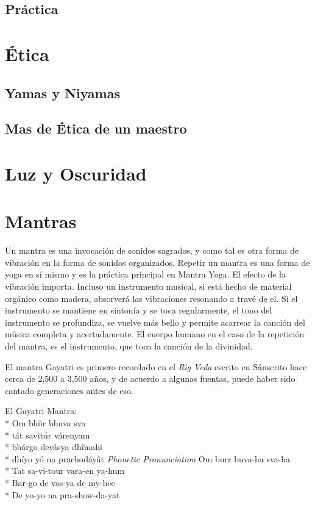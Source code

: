 \subsection{Práctica}
\section{Ética}
\subsection{Yamas y Niyamas}
\subsection{Mas de Ética de un maestro}
\section{Luz y Oscuridad}
\section{Mantras}
Un mantra es una invocación de sonidos sagrados, y como tal es otra forma de vibración en la forma de sonidos organizados. Repetir un mantra es una forma de yoga en sí mismo y es la práctica principal en Mantra Yoga. El efecto de la vibración importa. Incluso un instrumento musical, si está hecho de material orgánico como madera, absorverá las vibraciones resonando a travé de el. Si el instrumento se mantiene en sintonía y se toca regularmente, el tono del instrumento se profundiza, se vuelve más bello y permite acarrear la canción del música completa y acertadamente. El cuerpo humano en el caso de la repetición del mantra, es el instrumento, que toca la canción de la divinidad.

El mantra Gayatri es primero recordado en el \textit{Rig Veda} escrito en Sánscrito hace cerca de 2,500 a 3,500 años, y de acuerdo a algunas fuentas, puede haber sido cantado generaciones antes de eso.

\begin{multicols}{2}
	El Gayatri Mantra:\\*
	Om bhûr bhuva sva\\*
	tát savitúr várenyam\\*
	bhárgo devásya dhîmahi\\*
	dhíyo yó na prachodáyât
	\columnbreak
	\textit{Phonetic Pronunciation}
	Om burr buva-ha sva-ha\\*
	Tat sa-vi-tour vara-en ya-hum\\*
	Bar-go de vas-ya de my-hee\\*
	De yo-yo na pra-show-da-yat
\end{multicols}

